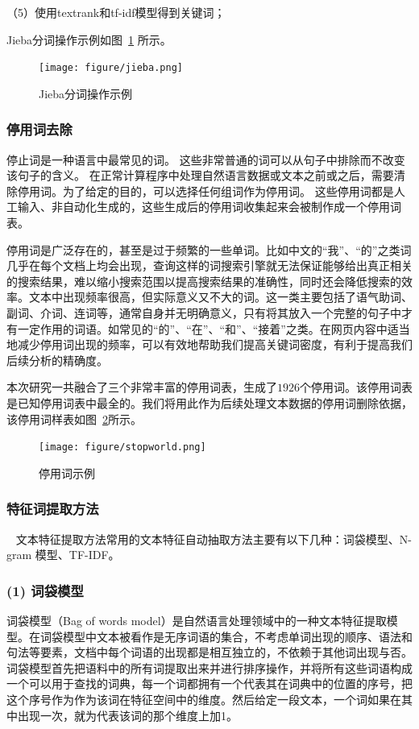 \documentclass[cs4size,a4paper]{ctexart}
\numberwithin{equation}{section}
\numberwithin{table}{section}
\numberwithin{figure}{section}
\begin{document}
（5）使用textrank和tf-idf模型得到关键词；

Jieba分词操作示例如图~\ref{fig:Jieba} 所示。
\begin{figure}
  \centering
  \texttt{[image: figure/jieba.png]}
\caption{Jieba分词操作示例}\label{fig:Jieba}
\end{figure}

\subsubsection{停用词去除}

停止词是一种语言中最常见的词。 这些非常普通的词可以从句子中排除而不改变该句子的含义。 在正常计算程序中处理自然语言数据或文本之前或之后，需要清除停用词。为了给定的目的，可以选择任何组词作为停用词。  这些停用词都是人工输入、非自动化生成的，这些生成后的停用词收集起来会被制作成一个停用词表。

停用词是广泛存在的，甚至是过于频繁的一些单词。比如中文的“我”、“的”之类词几乎在每个文档上均会出现，查询这样的词搜索引擎就无法保证能够给出真正相关的搜索结果，难以缩小搜索范围以提高搜索结果的准确性，同时还会降低搜索的效率。文本中出现频率很高，但实际意义又不大的词。这一类主要包括了语气助词、副词、介词、连词等，通常自身并无明确意义，只有将其放入一个完整的句子中才有一定作用的词语。如常见的“的”、“在”、“和”、“接着”之类。在网页内容中适当地减少停用词出现的频率，可以有效地帮助我们提高关键词密度，有利于提高我们后续分析的精确度。

本次研究一共融合了三个非常丰富的停用词表，生成了$1926$个停用词。该停用词表是已知停用词表中最全的。我们将用此作为后续处理文本数据的停用词删除依据，该停用词样表如图~\ref{fig:stopWorld}所示。

\begin{figure}
  \centering
  \texttt{[image: figure/stopworld.png]}
\caption{停用词示例}\label{fig:stopWorld}
\end{figure}

\subsubsection{特征词提取方法}~\label{subsec:feature}
文本特征提取方法常用的文本特征自动抽取方法主要有以下几种：词袋模型、N-gram 模型、TF-IDF。

\subsubsection*{(1) 词袋模型}

词袋模型（Bag of words model）是自然语言处理领域中的一种文本特征提取模型。在词袋模型中文本被看作是无序词语的集合，不考虑单词出现的顺序、语法和句法等要素，文档中每个词语的出现都是相互独立的，不依赖于其他词出现与否。
词袋模型首先把语料中的所有词提取出来并进行排序操作，并将所有这些词语构成一个可以用于查找的词典，每一个词都拥有一个代表其在词典中的位置的序号，把这个序号作为作为该词在特征空间中的维度。然后给定一段文本，一个词如果在其中出现一次，就为代表该词的那个维度上加1。
\end{document}
